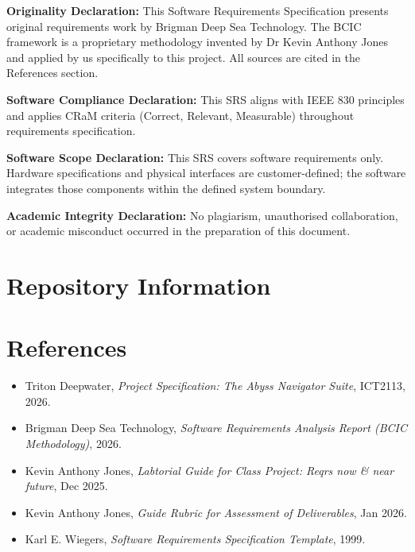 \documentclass[11pt,a4paper]{article}
\begin{document}
\textbf{Originality Declaration:} This Software Requirements Specification presents original requirements work by Brigman Deep Sea Technology. The BCIC framework is a proprietary methodology invented by Dr Kevin Anthony Jones and applied by us specifically to this project. All sources are cited in the References section.

\textbf{Software Compliance Declaration:} This SRS aligns with IEEE 830 principles and applies CRaM criteria (Correct, Relevant, Measurable) throughout requirements specification.

\textbf{Software Scope Declaration:} This SRS covers software requirements only. Hardware specifications and physical interfaces are customer-defined; the software integrates those components within the defined system boundary.

\textbf{Academic Integrity Declaration:} No plagiarism, unauthorised collaboration, or academic misconduct occurred in the preparation of this document.

\section*{Repository Information}
\begin{center}
\end{center}

\clearpage
{}
\setcounter{page}{1}
\renewcommand{\thepage}{R-\arabic{page}}
\section*{References}
\begin{itemize}[leftmargin=*,nosep]
  \item Triton Deepwater, \textit{Project Specification: The Abyss Navigator Suite}, ICT2113, 2026.
  \item Brigman Deep Sea Technology, \textit{Software Requirements Analysis Report (BCIC Methodology)}, 2026.
  \item Kevin Anthony Jones, \textit{Labtorial Guide for Class Project: Reqrs now \& near future}, Dec 2025.
  \item Kevin Anthony Jones, \textit{Guide Rubric for Assessment of Deliverables}, Jan 2026.
  \item Karl E. Wiegers, \textit{Software Requirements Specification Template}, 1999.
\end{itemize}
\end{document}
